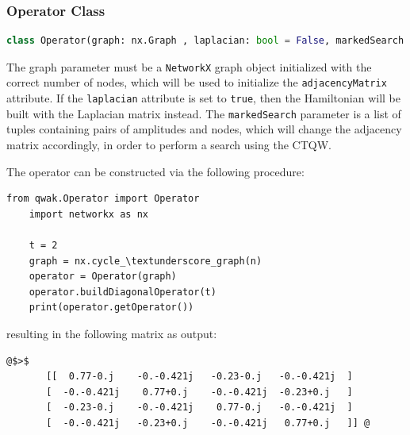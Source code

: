 \documentclass[main.tex]{subfiles}
\begin{document}
\subsubsection{Operator Class}
\begin{lstlisting}[style=commands,mathescape,language=Python]
    class Operator(graph: nx.Graph , laplacian: bool = False, markedSearch: list = None)
\end{lstlisting}
The graph parameter must be a \texttt{NetworkX} graph object initialized with
the correct number of nodes, which will be used to initialize the
\texttt{adjacencyMatrix} attribute. If the \texttt{laplacian} attribute is set
to \texttt{true}, then the Hamiltonian will be built with the Laplacian matrix
instead. The \texttt{markedSearch} parameter is a list of tuples containing
pairs of amplitudes and nodes, which will change the adjacency matrix
accordingly, in order to perform a search using the CTQW.\par

The operator can be constructed via the following procedure:
\begin{lstlisting}[style=code,escapeinside={__}]
    from qwak.Operator import Operator 
    import networkx as nx
    
    t = 2
    graph = nx.cycle_\textunderscore_graph(n)
    operator = Operator(graph)
    operator.buildDiagonalOperator(t)
    print(operator.getOperator())
\end{lstlisting}
resulting in the following matrix as output:
\begin{lstlisting}[style=commands,mathescape]
@$>$
       [[  0.77-0.j    -0.-0.421j   -0.23-0.j   -0.-0.421j  ]
       [  -0.-0.421j    0.77+0.j    -0.-0.421j  -0.23+0.j   ]
       [  -0.23-0.j    -0.-0.421j    0.77-0.j   -0.-0.421j  ]
       [  -0.-0.421j   -0.23+0.j    -0.-0.421j   0.77+0.j   ]] @
\end{lstlisting}
\end{document}
